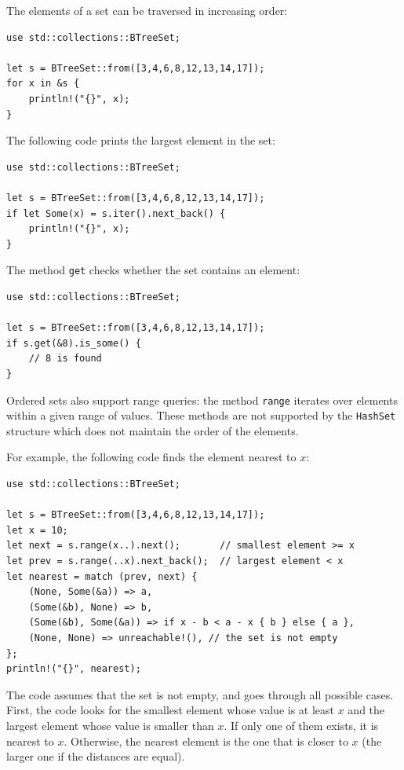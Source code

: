 The elements of a set can be traversed
in increasing order:

\begin{lstlisting}
use std::collections::BTreeSet;

let s = BTreeSet::from([3,4,6,8,12,13,14,17]);
for x in &s {
    println!("{}", x);
}
\end{lstlisting}
The following code prints the largest element in the set:
\begin{lstlisting}
use std::collections::BTreeSet;

let s = BTreeSet::from([3,4,6,8,12,13,14,17]);
if let Some(x) = s.iter().next_back() {
    println!("{}", x);
}
\end{lstlisting}

The method \texttt{get} checks
whether the set contains an element:

\begin{lstlisting}
use std::collections::BTreeSet;

let s = BTreeSet::from([3,4,6,8,12,13,14,17]);
if s.get(&8).is_some() {
    // 8 is found
}
\end{lstlisting}

Ordered sets also support range queries:
the method \texttt{range} iterates over
elements within a given range of values.
These methods are not supported by the
\texttt{HashSet} structure which
does not maintain the order of the elements.

For example, the following code finds the element
nearest to $x$:

\begin{lstlisting}
use std::collections::BTreeSet;

let s = BTreeSet::from([3,4,6,8,12,13,14,17]);
let x = 10;
let next = s.range(x..).next();       // smallest element >= x
let prev = s.range(..x).next_back();  // largest element < x
let nearest = match (prev, next) {
    (None, Some(&a)) => a,
    (Some(&b), None) => b,
    (Some(&b), Some(&a)) => if x - b < a - x { b } else { a },
    (None, None) => unreachable!(), // the set is not empty
};
println!("{}", nearest);
\end{lstlisting}

The code assumes that the set is not empty,
and goes through all possible cases.
First, the code looks for the smallest
element whose value is at least $x$
and the largest element whose value is smaller than $x$.
If only one of them exists,
it is nearest to $x$.
Otherwise, the nearest element is the one
that is closer to $x$
(the larger one if the distances are equal).

